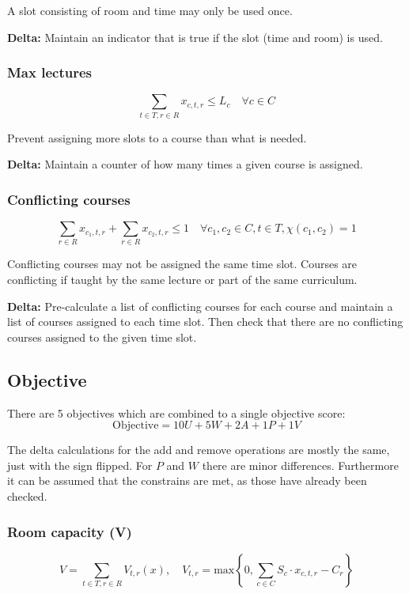 A slot consisting of room and time may only be used once.

\textbf{Delta:} Maintain an indicator that is true if the slot (time and room) is used.

\subsubsection{Max lectures}
\begin{equation}
\sum_{t \in T, r \in R} x_{c, t, r} \le L_c \quad \forall c \in C
\end{equation}

Prevent assigning more slots to a course than what is needed.

\textbf{Delta: } Maintain a counter of how many times a given course is assigned.

\subsubsection{Conflicting courses}
\begin{equation}
\sum_{r \in R} x_{c_1, t, r} + \sum_{r \in R} x_{c_2, t, r} \le 1 \quad \forall c_1, c_2 \in C, t \in T, \chi(c_1, c_2) = 1
\end{equation}

Conflicting courses may not be assigned the same time slot. Courses are conflicting if taught by the same lecture or part of the same curriculum.

\textbf{Delta: } Pre-calculate a list of conflicting courses for each course and maintain a list of courses assigned to each time slot. Then check that there are no conflicting courses assigned to the given time slot.

\subsection{Objective}
\label{sec:problem-objective}

There are 5 objectives which are combined to a single objective score:
\begin{equation}
\mathrm{Objective} = 10 U + 5 W + 2 A + 1 P + 1 V
\end{equation}

The delta calculations for the add and remove operations are mostly the same, just with the sign flipped. For $P$ and $W$ there are minor differences. Furthermore it can be assumed that the constrains are met, as those have already been checked.

\subsubsection{Room capacity (V)}
\begin{equation}
V = \sum_{t \in T, r \in R} V_{t, r}(x), \quad V_{t, r} = \mathrm{max}\left\{ 0, \sum_{c \in C} S_c \cdot x_{c, t, r} - C_r \right\}
\end{equation}

